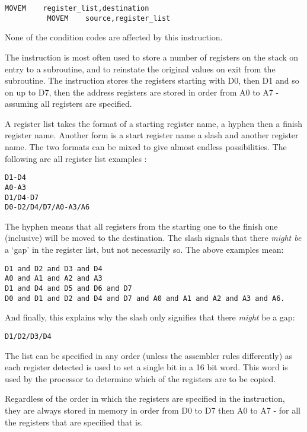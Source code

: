 \begin{lstlisting}[firstnumber=1,]
          MOVEM    register_list,destination
          MOVEM    source,register_list
\end{lstlisting}

None of the condition codes are affected by this instruction.

The instruction is most often used to store a number of registers on
    the stack on entry to a subroutine, and to reinstate the original values
    on exit from the subroutine. The instruction stores the registers starting
    with D0, then D1 and so on up to D7, then the address registers are stored
    in order from A0 to A7 -{} assuming all registers are specified.

A register list takes the format of a starting register name, a
    hyphen then a finish register name. Another form is a start register name
    a slash and another register name. The two formats can be mixed to give
    almost endless possibilities. The following are all register list examples
   :

\begin{lstlisting}[frame=none,numbers=none]
D1-D4
A0-A3
D1/D4-D7
D0-D2/D4/D7/A0-A3/A6
\end{lstlisting}

The hyphen means that all registers from the starting one to the
    finish one (inclusive) will be moved to the destination. The slash signals
    that there \emph{might be} a `gap' in the register list, but not necessarily so. The above examples mean:

\begin{lstlisting}[frame=none,numbers=none]
D1 and D2 and D3 and D4
A0 and A1 and A2 and A3
D1 and D4 and D5 and D6 and D7
D0 and D1 and D2 and D4 and D7 and A0 and A1 and A2 and A3 and A6.
\end{lstlisting}

And finally, this explains why the slash only signifies that there \emph{might} be a gap:

\begin{lstlisting}[frame=none,numbers=none]
D1/D2/D3/D4
\end{lstlisting}


The list can be specified in any order (unless the assembler rules
    differently) as each register detected is used to set a single bit in a 16
    bit word. This word is used by the processor to determine which of the
    registers are to be copied.
    
    Regardless of the order in which the registers are specified in the instruction, they are always stored in memory in order from D0 to D7 then A0 to A7 - for all the registers that are specified that is.

